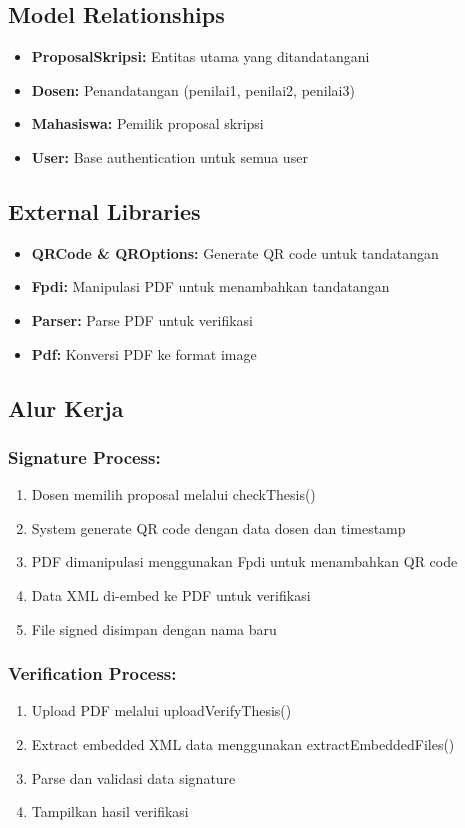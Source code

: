 \documentclass[11pt,a4paper]{article}
\begin{document}
\subsection{Model Relationships}
\begin{itemize}
    \item \textbf{ProposalSkripsi:} Entitas utama yang ditandatangani
    \item \textbf{Dosen:} Penandatangan (penilai1, penilai2, penilai3)
    \item \textbf{Mahasiswa:} Pemilik proposal skripsi
    \item \textbf{User:} Base authentication untuk semua user
\end{itemize}

\subsection{External Libraries}
\begin{itemize}
    \item \textbf{QRCode \& QROptions:} Generate QR code untuk tandatangan
    \item \textbf{Fpdi:} Manipulasi PDF untuk menambahkan tandatangan
    \item \textbf{Parser:} Parse PDF untuk verifikasi
    \item \textbf{Pdf:} Konversi PDF ke format image
\end{itemize}

\subsection{Alur Kerja}
\subsubsection{Signature Process:}
\begin{enumerate}
    \item Dosen memilih proposal melalui checkThesis()
    \item System generate QR code dengan data dosen dan timestamp
    \item PDF dimanipulasi menggunakan Fpdi untuk menambahkan QR code
    \item Data XML di-embed ke PDF untuk verifikasi
    \item File signed disimpan dengan nama baru
\end{enumerate}

\subsubsection{Verification Process:}
\begin{enumerate}
    \item Upload PDF melalui uploadVerifyThesis()
    \item Extract embedded XML data menggunakan extractEmbeddedFiles()
    \item Parse dan validasi data signature
    \item Tampilkan hasil verifikasi
\end{enumerate}
\end{document}
